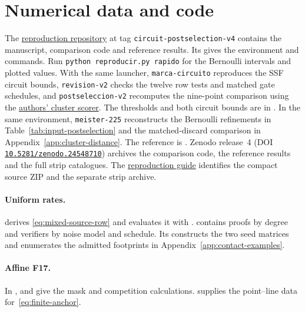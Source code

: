 \documentclass[10pt,twocolumn]{article}
\theoremstyle{definition}
\begin{document}
\section{Numerical data and code}\label{app:support}
\begingroup\raggedright
The \href{https://github.com/vicenzoscavino1999/ssf-qec-reproduction/tree/circuit-postselection-v4}{reproduction repository}
at tag \texttt{circuit-postselection-v4} contains the manuscript,
comparison code and reference results. Its 
gives the environment and commands.
Run \mbox{\texttt{python reproducir.py rapido}} for the Bernoulli
intervals and plotted values. With the same launcher,
\texttt{marca-circuito} reproduces the SSF circuit bounds,
\texttt{revision-v2} checks the twelve row tests and matched gate
schedules, and \texttt{postseleccion-v2} recomputes the nine-point comparison
using the \href{https://github.com/seokhyung-lee/ldpc-post-selection/tree/4e5989a6c0aed8f140840979652645423e2f21f1}{authors' cluster scorer}.
The thresholds and both circuit bounds are in
. In the same
environment, \texttt{meister-225} reconstructs the Bernoulli refinements
in Table~\ref{tab:input-postselection} and the matched-discard comparison
in Appendix~\ref{app:cluster-distance}. The reference is
.
Zenodo release~4 (DOI \href{https://doi.org/10.5281/zenodo.24548710}{\nolinkurl{10.5281/zenodo.24548710}}) archives the comparison code,
the reference results and the full strip catalogues. The \href{https://zenodo.org/records/24548710/files/REPRODUCTION.md?download=1}{reproduction guide}
identifies the compact source ZIP and the separate strip archive.

\paragraph{Uniform rates.}
 derives \eqref{eq:mixed-source-row}
and evaluates it with . 
contains proofs by degree and verifiers by noise model and schedule.
Its  constructs the two seed matrices
and enumerates the admitted footprints in Appendix~\ref{app:contact-examples}.

\paragraph{Affine F17.}
In , 
and  give the mask and competition calculations.
 supplies the point--line data
for~\eqref{eq:finite-anchor}.
\end{document}
